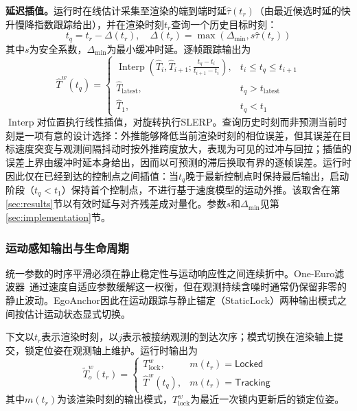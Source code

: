 \documentclass[review]{vgtc}
\begin{document}
\textbf{延迟插值。}运行时在线估计采集至渲染的端到端时延$\widehat{\tau}(t_r)$（由最近候选时延的快升慢降指数跟踪给出），并在渲染时刻$t_r$查询一个历史目标时刻：
\begin{equation}
t_q = t_r - \Delta(t_r), \quad \Delta(t_r) = \max\!\left(\Delta_{\min}, s\widehat{\tau}(t_r)\right)
\label{eq:target-time}
\end{equation}
其中$s$为安全系数，$\Delta_{\min}$为最小缓冲时延。逐帧跟踪输出为
\begin{equation}
\widehat{T}^w(t_q) = \begin{cases}
\operatorname{Interp}\!\left(\widehat{T}_i, \widehat{T}_{i+1}; \frac{t_q - t_i}{t_{i+1} - t_i}\right), & t_i \leq t_q \leq t_{i+1} \\
\widehat{T}_{\mathrm{latest}}, & t_q > t_{\mathrm{latest}} \\
\widehat{T}_1, & t_q < t_1
\end{cases}
\label{eq:delayed-interp}
\end{equation}
$\operatorname{Interp}$对位置执行线性插值，对旋转执行SLERP。查询历史时刻而非预测当前时刻是一项有意的设计选择：外推能够降低当前渲染时刻的相位误差，但其误差在目标速度突变与观测间隔抖动时按外推跨度放大，表现为可见的过冲与回拉；插值的误差上界由缓冲时延本身给出，因而以可预测的滞后换取有界的逐帧误差。运行时因此仅在已经到达的控制点之间插值：当$t_q$晚于最新控制点时保持最后输出，启动阶段（$t_q < t_1$）保持首个控制点，不进行基于速度模型的运动外推。该取舍在第\ref{sec:results}节以有效时延与对齐残差成对量化。参数$s$和$\Delta_{\min}$见第\ref{sec:implementation}节。

\subsubsection{运动感知输出与生命周期}\label{sec:staticlock}

统一参数的时序平滑必须在静止稳定性与运动响应性之间连续折中。One-Euro滤波器~\cite{casiez2012oneeuro}通过速度自适应参数缓解这一权衡，但在观测持续含噪时通常仍保留非零的静止波动。EgoAnchor因此在运动跟踪与静止锚定（StaticLock）两种输出模式之间按估计运动状态显式切换。

下文以$t_r$表示渲染时刻，以$j$表示被接纳观测的到达次序；模式切换在渲染轴上提交，锁定位姿在观测轴上维护。运行时输出为
\begin{equation}
\widetilde{T}_o^w(t_r) = \begin{cases}
T_{\mathrm{lock}}^w, & m(t_r) = \mathsf{Locked} \\
\widehat{T}^w(t_q), & m(t_r) = \mathsf{Tracking}
\end{cases}
\label{eq:staticlock}
\end{equation}
其中$m(t_r)$为该渲染时刻的输出模式，$T_{\mathrm{lock}}^w$为最近一次锁内更新后的锁定位姿。
\end{document}
